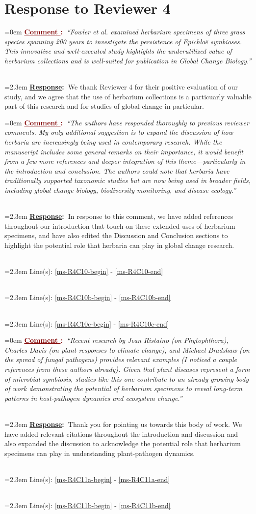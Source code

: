 \documentclass[12pt]{article}
\newcounter{cN}
\newcommand{\comment}[1]{
	\vspace{2em}
	\refstepcounter{cN} %
	\noindent \hangindent=0em \textbf{\textcolor{Maroon}{\uline{Comment \thecN}:~}}\emph{``#1''}
	}
\newcommand{\response}[1]{
	\\[0.25em]
	\hangindent=2.3em \textbf{\textcolor{NavyBlue}{\uline{Response}:~}}#1
	}
\newcommand{\linesref}[2]{
		\\[0.25em]
	\hangindent=2.3em {\color{Mahogany} Line(s): \ref{#1} - \ref{#2}}
}
\begin{document}
\section{Response to Reviewer 4}
\vspace{-2em}

\comment{Fowler et al. examined herbarium specimens of three grass species spanning 200 years to investigate the persistence of Epichloë symbioses. This innovative and well-executed study highlights the underutilized value of herbarium collections and is well-suited for publication in Global Change Biology.}
\response{We thank Reviewer 4 for their positive evaluation of our study, and we agree that the use of herbarium collections is a particuarly valuable part of this research and for studies of global change in particular.}


\comment{The authors have responded thoroughly to previous reviewer comments. My only additional suggestion is to expand the discussion of how herbaria are increasingly being used in contemporary research. While the manuscript includes some general remarks on their importance, it would benefit from a few more references and deeper integration of this theme—particularly in the introduction and conclusion. The authors could note that herbaria have traditionally supported taxonomic studies but are now being used in broader fields, including global change biology, biodiversity monitoring, and disease ecology.}
\response{In response to this comment, we have added references throughout our introduction that touch on these extended uses of herbarium specimens, and have also edited the Discussion and Conclusion sections to highlight the potential role that herbaria can play in global change research.}
\linesref{ms-R4C10-begin}{ms-R4C10-end}
\linesref{ms-R4C10b-begin}{ms-R4C10b-end}
\linesref{ms-R4C10c-begin}{ms-R4C10c-end}

\comment{Recent research by Jean Ristaino (on Phytophthora), Charles Davis (on plant responses to climate change), and Michael Bradshaw (on the spread of fungal pathogens) provides relevant examples (I noticed a couple references from these authors already). Given that plant diseases represent a form of microbial symbiosis, studies like this one contribute to an already growing body of work demonstrating the potential of herbarium specimens to reveal long-term patterns in host-pathogen dynamics and ecosystem change.}
\response{Thank you for pointing us towards this body of work. We have added relevant citations throughout the introduction and discussion and also expanded the discussion to acknowledge the potential role that herbarium specimens can play in understanding plant-pathogen dynamics.}
\linesref{ms-R4C11a-begin}{ms-R4C11a-end}
\linesref{ms-R4C11b-begin}{ms-R4C11b-end}



 








\end{document}
